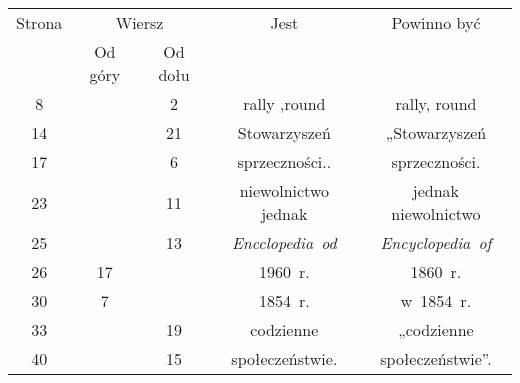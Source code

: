 \documentclass[a4paper,11pt]{article}
\numberwithin{equation}{section}
\begin{document}





\newpage



\begin{center}

  \begin{tabular}{|c|c|c|c|c|}
    \hline
    Strona & \multicolumn{2}{c|}{Wiersz} & Jest
                              & Powinno być \\ \cline{2-3}
    & Od góry & Od dołu & & \\
    \hline
    8   & &  2 & rally ,round & rally, round \\
    14  & & 21 & Stowarzyszeń & „Stowarzyszeń \\
    17  & &  6 & sprzeczności.. & sprzeczności. \\
    23  & & 11 & niewolnictwo jednak & jednak niewolnictwo \\
    25  & & 13 & \textit{Encclopedia~od} & \textit{Encyclopedia~of} \\
    26  & 17 & & 1960~r. & 1860~r. \\
    30  &  7 & & 1854~r. & w~1854~r. \\
    33  & & 19 & codzienne & „codzienne \\
    40  & & 15 & społeczeństwie. & społeczeństwie”. \\
    \hline
  \end{tabular}






\end{center}
\end{document}
